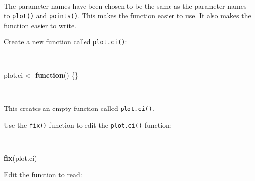 \documentclass[12pt,a4paper]{book}
\newenvironment{Shaded}{\begin{snugshade}}{\end{snugshade}}
\newcommand{\KeywordTok}[1]{\textcolor[rgb]{0.13,0.29,0.53}{\textbf{#1}}}
\newcommand{\StringTok}[1]{\textcolor[rgb]{0.31,0.60,0.02}{#1}}
\newcommand{\ControlFlowTok}[1]{\textcolor[rgb]{0.13,0.29,0.53}{\textbf{#1}}}
\newcommand{\NormalTok}[1]{#1}
\theoremstyle{definition}
\theoremstyle{definition}
\theoremstyle{definition}
\theoremstyle{remark}
\begin{document}
~

The parameter names have been chosen to be the same as the parameter
names to \texttt{plot()} and \texttt{points()}. This makes the function
easier to use. It also makes the function easier to write.

Create a new function called \texttt{plot.ci()}:

~

\begin{Shaded}
\begin{Highlighting}[]
\NormalTok{plot.ci <-}\StringTok{ }\ControlFlowTok{function}\NormalTok{() \{\}}
\end{Highlighting}
\end{Shaded}

~

This creates an empty function called \texttt{plot.ci()}.

Use the \texttt{fix()} function to edit the \texttt{plot.ci()} function:

~

\begin{Shaded}
\begin{Highlighting}[]
\KeywordTok{fix}\NormalTok{(plot.ci)}
\end{Highlighting}
\end{Shaded}

\newpage

Edit the function to read:

~
\end{document}
